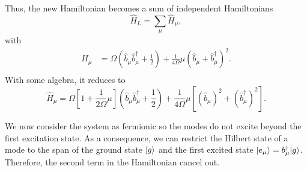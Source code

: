 Thus, the new Hamiltonian becomes a sum of independent Hamiltonians
\begin{equation}
    \hat H_L = \sum_\mu \hat H_\mu,
\end{equation}
with
\begin{equation}
    \begin{split}
        \hat H_\mu &= \Omega \left(\hat b_\mu\hat b^\dagger_\mu + \frac{1}{2}\right) + \frac{1}{4\Omega}\mu\left(\hat b_\mu +\hat b_\mu^\dagger\right)^2.\\
    \end{split}
\end{equation}
With some algebra, it reduces to 
\begin{equation}
    \hat H_\mu = \Omega \left[ 1 + \frac{1}{2\Omega}\mu\right] \left(\hat b_\mu\hat b^\dagger_\mu + \frac{1}{2}\right) + \frac{1}{4\Omega}\mu\left[\left(\hat b_\mu\right)^2 +\left(\hat b_\mu^\dagger\right)^2 \right].
\end{equation}


We now consider the system as fermionic so the modes do not excite beyond the first excitation state. As a consequence, we can restrict the Hilbert state of a mode to the span of the ground state $\lvert g\rangle$ and the first excited state $\lvert e_\mu\rangle=b_\mu^\dagger\lvert g\rangle$. Therefore, the second term in the Hamiltonian cancel out. 

